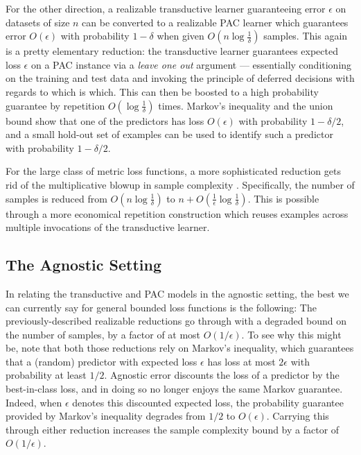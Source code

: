 For the other direction, a realizable transductive learner guaranteeing error $\epsilon$ on datasets of size $n$ can be  converted to a realizable PAC learner which guarantees error $O(\epsilon)$ with probability $1-\delta$ when given $O(n \log \frac{1}{\delta})$ samples. This again is a pretty elementary reduction: the transductive learner guarantees expected loss $\epsilon$ on a PAC instance via a \emph{leave one out} argument --- essentially conditioning on the training and test data and invoking the principle of deferred decisions with regards to which is which. This can then be boosted to a high probability guarantee by repetition $O(\log \frac{1}{\delta})$ times. Markov's inequality and the union bound show that one of the predictors has loss $O(\epsilon)$ with probability $1-\delta/2$, and a small hold-out set of examples can be used to identify such a predictor with probability $1-\delta/2$.

For the large class of metric loss functions, a more sophisticated  reduction gets rid of the multiplicative blowup in sample complexity \cite{aden-ali_optimal_2023,dughmi_is_2024}. Specifically, the number of samples is reduced from $O\left(n \log \frac{1}{\delta}\right)$ to $n+O\left(\frac{1}{\epsilon} \log \frac{1}{\delta}\right)$. This is possible through a more economical repetition construction which reuses examples across multiple invocations of the transductive learner.


\subsection*{The Agnostic Setting}
In relating the transductive and PAC models in the agnostic setting, the best we can currently say for general bounded loss functions is the following:  The previously-described realizable reductions go through with a degraded bound on the number of samples, by a factor of at most $O(1/\epsilon)$. To see why this might be, note that both those reductions rely on Markov's inequality, which guarantees that a (random) predictor with expected loss $\epsilon$ has loss at most $2 \epsilon$ with probability at least $1/2$. Agnostic error discounts the loss of a predictor by the best-in-class loss, and in doing so no longer enjoys the same Markov guarantee. Indeed, when $\epsilon$ denotes this discounted expected loss, the probability guarantee provided by Markov's inequality degrades from $1/2$ to $O(\epsilon)$. Carrying this through either reduction increases the sample complexity bound by a factor of~$O(1/\epsilon)$.

